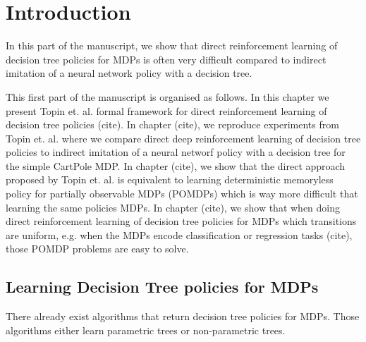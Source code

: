 \chapter{Introduction}
In this part of the manuscript, we show that direct reinforcement learning of decision tree policies for MDPs is often very difficult compared to indirect imitation of a neural network policy with a decision tree.

This first part of the manuscript is organised as follows.
In this chapter we present Topin et. al. formal framework for direct reinforcement learning of decision tree policies (cite).
In chapter (cite), we reproduce experiments from Topin et. al. where we compare direct deep reinforcement learning of decision tree policies to indirect imitation of a neural networf policy with a decision tree for the simple CartPole MDP.
In chapter (cite), we show that the direct approach proposed by Topin et. al. is equivalent to learning deterministic memoryless policy for partially observable MDPs (POMDPs) which is way more difficult that learning the same policies MDPs.
In chapter (cite), we show that when doing direct reinforcement learning of decision tree policies for MDPs which transitions are uniform, e.g. when the MDPs encode classification or regression tasks (cite), those POMDP problems are easy to solve. 

\section{Learning Decision Tree policies for MDPs}
There already exist algorithms that return decision tree policies for MDPs.
Those algorithms either learn parametric trees or non-parametric trees.

